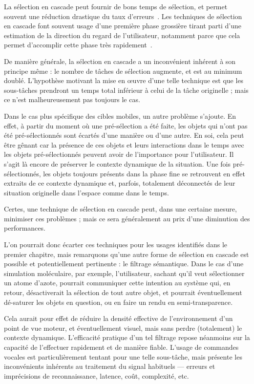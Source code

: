     La sélection en cascade peut fournir de bons temps de sélection, et permet souvent une réduction drastique du taux d'erreurs~\cite{kopper2011rapid}. Les techniques de sélection en cascade font souvent usage d'une première phase grossière tirant parti d'une estimation de la direction du regard de l'utilisateur, notamment parce que cela permet d'accomplir cette phase très rapidement~\cite{debarba2013disambiguation}.
    
    De manière générale, la sélection en cascade a un inconvénient inhérent à son principe même : le nombre de tâches de sélection augmente, et est au minimum doublé. L'hypothèse motivant la mise en \oe{}uvre d'une telle technique est que les sous-tâches prendront un temps total inférieur à celui de la tâche originelle ; mais ce n'est malheureusement pas toujours le cas.
    
    Dans le cas plus spécifique des cibles mobiles, un autre problème s'ajoute. En effet, à partir du moment où une pré-sélection a été faite, les objets qui n'ont pas été pré-sélectionnés sont écartés d'une manière ou d'une autre. En soi, cela peut être gênant car la présence de ces objets et leurs interactions dans le temps avec les objets pré-sélectionnés peuvent avoir de l'importance pour l'utilisateur. Il s'agit là encore de préserver le contexte dynamique de la situation. Une fois pré-sélectionnés, les objets toujours présents dans la phase fine se retrouvent en effet extraits de ce contexte dynamique et, parfois, totalement déconnectés de leur situation originelle dans l'espace comme dans le temps.
    
    Certes, une technique de sélection en cascade peut, dans une certaine mesure, minimiser ces problèmes ; mais ce sera généralement au prix d'une diminution des performances.
    
    L'on pourrait donc écarter ces techniques pour les usages identifiés dans le premier chapitre, mais remarquons qu'une autre forme de sélection en cascade est possible et potentiellement pertinente : le filtrage sémantique. Dans le cas d'une simulation moléculaire, par exemple, l'utilisateur, sachant qu'il veut sélectionner un atome d'azote, pourrait communiquer cette intention au système qui, en retour, désactiverait la sélection de tout autre objet, et pourrait éventuellement dé-saturer les objets en question, ou en faire un rendu en semi-transparence.
    
    Cela aurait pour effet de réduire la densité effective de l'environnement d'un point de vue moteur, et éventuellement visuel, mais sans perdre (totalement) le contexte dynamique. L'efficacité pratique d'un tel filtrage repose néanmoins sur la capacité de l'effectuer rapidement et de manière fiable. L'usage de commandes vocales est particulièrement tentant pour une telle sous-tâche, mais présente les inconvénients inhérents au traitement du signal habituels --- erreurs et imprécisions de reconnaissance, latence, coût, complexité, etc.
    
